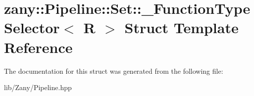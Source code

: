 \hypertarget{structzany_1_1_pipeline_1_1_set_1_1___function_type_selector}{}\section{zany\+:\+:Pipeline\+:\+:Set\+:\+:\+\_\+\+Function\+Type\+Selector$<$ R $>$ Struct Template Reference}
\label{structzany_1_1_pipeline_1_1_set_1_1___function_type_selector}


The documentation for this struct was generated from the following file\+:\begin{DoxyCompactItemize}
\item 
lib/\+Zany/Pipeline.\+hpp\end{DoxyCompactItemize}
